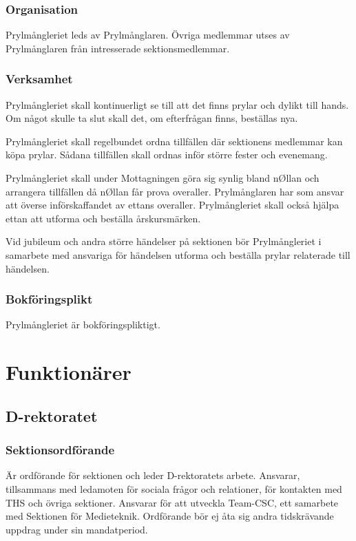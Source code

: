\documentclass{dgovdoc}
\begin{document}
\subsubsection{Organisation}
Prylmångleriet leds av Prylmånglaren. Övriga medlemmar utses av Prylmånglaren från intresserade sektionsmedlemmar.

\subsubsection{Verksamhet}
Prylmångleriet skall kontinuerligt se till att det finns prylar och dylikt till hands. Om något skulle ta slut skall det, om efterfrågan finns, beställas nya.

Prylmångleriet skall regelbundet ordna tillfällen där sektionens medlemmar kan köpa prylar. Sådana tillfällen skall ordnas inför större fester och evenemang.

Prylmångleriet skall under Mottagningen göra sig synlig bland nØllan och arrangera tillfällen då nØllan får prova overaller. Prylmånglaren har som ansvar att överse införskaffandet av ettans overaller. Prylmångleriet skall också hjälpa ettan att utforma och beställa årskursmärken.

Vid jubileum och andra större händelser på sektionen bör Prylmångleriet i samarbete med ansvariga för händelsen utforma och beställa prylar relaterade till händelsen.

\subsubsection{Bokföringsplikt}
Prylmångleriet är bokföringspliktigt.

\section{Funktionärer}

\subsection{D-rektoratet}

\subsubsection{Sektionsordförande}

Är ordförande för sektionen och leder D-rektoratets arbete. Ansvarar,
tillsammans med ledamoten för sociala frågor och relationer, för kontakten med
THS och övriga sektioner. Ansvarar för att utveckla Team-CSC, ett samarbete med
Sektionen för Medieteknik. Ordförande bör ej åta sig andra tidskrävande uppdrag
under sin mandatperiod.
\end{document}
